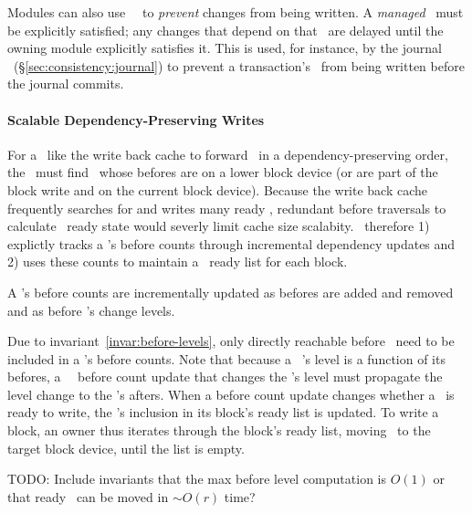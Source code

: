 Modules can also use \noop\ \chdescs\ to \emph{prevent} changes from being
 written.
%
A \emph{managed} \noop\ must be explicitly satisfied; any changes that
 depend on that \noop\ are delayed until the owning module explicitly
 satisfies it.
%
This is used, for instance, by the journal \module\
 (\S\ref{sec:consistency:journal}) to prevent a transaction's \chdescs\
 from being written before the journal commits.

\paragraph{Scalable Dependency-Preserving Writes}
For a \module\ like the write back cache to forward \chdescs\ in a
dependency-preserving order, the \module\ must find \chdescs\ whose
befores are on a lower block device (or are part of the block write
and on the current block device). Because the write back cache
frequently searches for and writes many ready \chdescs{}, redundant
before traversals to calculate \chdesc\ ready state would severly
limit cache size scalabity.
%
\Kudos\ therefore
%
1) explictly tracks a \chdesc{}'s before counts through incremental
dependency updates
%
and 2) uses these counts to maintain a \chdesc\ ready list for each
block.

A \chdesc{}'s before counts are incrementally updated
%
as befores are added and removed
%
and as before \chdesc{}'s change levels.
%

Due to invariant~\ref{invar:before-levels}, only directly reachable
before \chdescs\ need to be included in a \chdesc's before counts.
%
Note that because a \noop\ \chdesc's level is a function of its befores,
%
a \noop\ \chdesc\ before count update that changes the \noop's level
must propagate the level change to the \noop's afters.
%
When a before count update changes whether a \chdesc\ is ready to
write, the \chdesc's inclusion in its block's ready list is updated.
%
To write a block, an owner thus iterates through the block's ready
list, moving \chdescs\ to the target block device, until the list is
empty.

TODO: Include invariants that the max before level computation is
$O(1)$ or that ready \chdescs\ can be moved in $\sim\! O(r)$ time?

